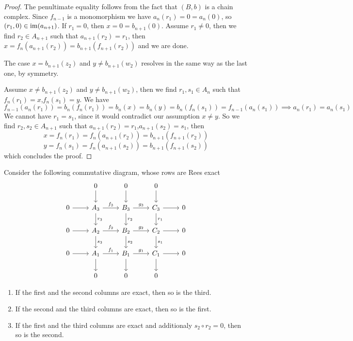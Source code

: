 \begin{proof}[Proof]
    The penultimate equality follows from the fact that $(B,b)$ is a chain complex. Since $f_{n-1}$
    is a monomorphism we have $a_n(r_1)=0=a_n(0)$, so $(r_1,0)\in\text{im}(a_{n+1})$. If 
    $r_1=0$, then $x=0=b_{n+1}(0)$. Assume $r_1\neq 0$, then we find $r_2\in A_{n+1}$ such that 
    $a_{n+1}(r_2) =r_1$, then $x= f_{n}(a_{n+1}(r_2)) = b_{n+1}(f_{n+1}(r_2))$ 
    and we are done.\par 
    The case $x=b_{n+1}(z_2)$ and $y\neq b_{n+1}(w_2)$ resolves in the same way as the last one, by symmetry.\par 
    Assume $x\neq b_{n+1}(z_2)$ and $y \neq b_{n+1}(w_2)$, then we find $r_1,s_1\in A_n$ such that 
    $f_n(r_1)=x$,$f_n(s_1)=y$. We have 
    \[
    f_{n-1}(a_n(r_1))=b_n(f_n(r_1))=b_n(x)=b_n(y)=b_n(f_n(s_1))=
    f_{n-1}(a_n(s_1)) \implies a_n(r_1) = a_n(s_1)
    \]
    We cannot have $r_1=s_1$, since it would contradict our assumption $x\neq y$. So 
    we find $r_2,s_2\in A_{n+1}$ such that $a_{n+1}(r_2)=r_1$,$a_{n+1}(s_2)=s_1$, then 
    \[
        x = f_n(r_1) = f_n(a_{n+1}(r_2)) = b_{n+1}(f_{n+1}(r_2))
    \]
    \[
        y = f_n(s_1) = f_n(a_{n+1}(s_2)) = b_{n+1}(f_{n+1}(s_2))
    \]
    which concludes the proof.
\end{proof}
\begin{corollary}[3x3 lemma]
    Consider the following commutative diagram, whose rows are Rees exact
    \[\begin{tikzcd}
        & 0 & 0 & 0 \\
        0 & {A_3} & {B_3} & {C_3} & 0 \\
        0 & {A_2} & {B_2} & {C_2} & 0 \\
        0 & {A_1} & {B_1} & {C_1} & 0 \\
        & 0 & 0 & 0
        \arrow[from=1-2, to=2-2]
        \arrow[from=1-3, to=2-3]
        \arrow[from=1-4, to=2-4]
        \arrow[from=2-1, to=2-2]
        \arrow["{f_3}", from=2-2, to=2-3]
        \arrow["{r_3}", from=2-2, to=3-2]
        \arrow["{g_3}", from=2-3, to=2-4]
        \arrow["{r_2}", from=2-3, to=3-3]
        \arrow[from=2-4, to=2-5]
        \arrow["{r_1}", from=2-4, to=3-4]
        \arrow[from=3-1, to=3-2]
        \arrow["{f_2}", from=3-2, to=3-3]
        \arrow["{s_3}", from=3-2, to=4-2]
        \arrow["{g_2}", from=3-3, to=3-4]
        \arrow["{s_2}", from=3-3, to=4-3]
        \arrow[from=3-4, to=3-5]
        \arrow["{s_1}", from=3-4, to=4-4]
        \arrow[from=4-1, to=4-2]
        \arrow["{f_1}", from=4-2, to=4-3]
        \arrow[from=4-2, to=5-2]
        \arrow["{g_1}", from=4-3, to=4-4]
        \arrow[from=4-3, to=5-3]
        \arrow[from=4-4, to=4-5]
        \arrow[from=4-4, to=5-4]
    \end{tikzcd}\]
    \begin{enumerate}
        \item If the first and the second columns are exact, then so is the third.
        \item If the second and the third columns are exact, then so is the first.
        \item If the first and the third columns are exact and additionaly $s_2\circ r_2=0$, then so is the second.
    \end{enumerate}
\end{corollary}
